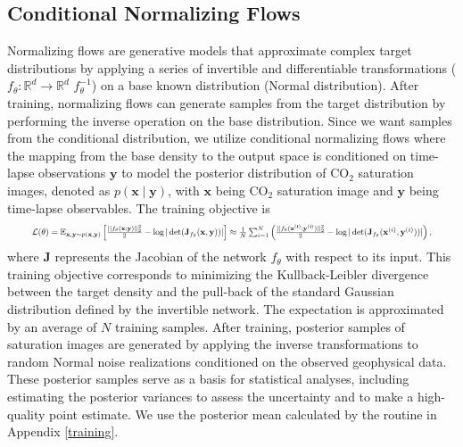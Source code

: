 \documentclass{article}
\begin{document}
\subsection{Conditional Normalizing Flows}
%
Normalizing flows are generative models that approximate complex target distributions by applying a series of invertible and differentiable transformations ($f_{\theta}: \mathbb{R}^d \rightarrow \mathbb{R}^d$  $f_{\theta}^{-1}$) on a base known distribution (Normal distribution)\cite{nf}. After training, normalizing flows can generate samples from the target distribution by performing the inverse operation on the base distribution. Since we want samples from the conditional distribution, we utilize conditional normalizing flows \cite{cnf} where the mapping from the base density to the output space is conditioned on time-lapse observations $\mathbf{y}$ to model the posterior distribution of CO$_2$ saturation images, denoted as $p\left(\mathbf{x}\mid\mathbf{y}\right)$, with $\mathbf{x}$ being CO$_2$ saturation image and $\mathbf{y}$ being time-lapse observables. The training objective is
%
\begin{equation}\label{eq1}
\resizebox{0.93\hsize}{!}{%
    $\mathcal{L}({\theta}) = \mathbb{E}_{\mathbf{x},\mathbf{y} \sim p(\mathbf{x}, \mathbf{y}) } \left[ \frac{|| f_{\theta}(\mathbf{x};\mathbf{y})||_{2}^{2} }{2} - \log|\det(\mathbf{J}_{f_{\theta}}(\mathbf{x}, \mathbf{y}))|  
    \right] 
    \approx 
    \frac{1}{N} \sum^{N}_{i=1} \left( \frac{|| f_{\theta}(\mathbf{x^{(i)}};\mathbf{y^{(i)}})||_{2}^{2} }{2} - \log|\det(\mathbf{J}_{f_{\theta}}(\mathbf{x}^{(i)}, \mathbf{y}^{(i)}))| \right),$%
    }
\end{equation}
%
where $\mathbf{J}$ represents the Jacobian of the network $f_{\theta}$ with respect to its input. This training objective corresponds to minimizing the Kullback-Leibler divergence between the target density and the pull-back of the standard Gaussian distribution defined by the invertible network\cite{siahkoohi2023reliable,orozco2023MIDLanf}. The expectation is approximated by an average of $N$ training samples. After training, posterior samples of saturation images are generated by applying the inverse transformations to random Normal noise realizations conditioned on the observed geophysical data. These posterior samples serve as a basis for statistical analyses, including estimating the posterior variances to assess the uncertainty and to make a high-quality point estimate. We use the posterior mean calculated by the routine in Appendix \ref{training}.
%
\end{document}
